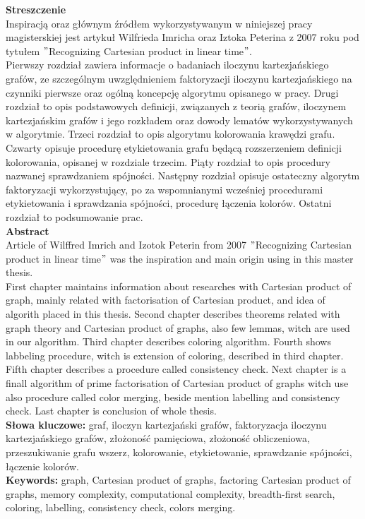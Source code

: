 \documentclass[12pt,a4paper,titlepage]{article}
\newcommand\tab[1][1cm]{\hspace*{#1}}
\begin{document}
\textbf{Streszczenie}\\
\tab[0.6cm]Inspiracją oraz głównym źródłem wykorzystywanym w niniejszej pracy magisterskiej jest artykuł Wilfrieda Imricha oraz Iztoka Peterina z 2007 roku pod tytułem $"$Recognizing Cartesian product in linear time$"$. \\
\tab[0.6cm]Pierwszy rozdział zawiera informacje o badaniach iloczynu kartezjańskiego grafów, ze szczególnym uwzględnieniem faktoryzacji iloczynu kartezjańskiego na czynniki pierwsze oraz ogólną koncepcję algorytmu opisanego w pracy. Drugi rozdział to opis podstawowych definicji, związanych z teorią grafów, iloczynem kartezjańskim grafów i jego rozkładem oraz dowody lematów wykorzystywanych w algorytmie. Trzeci rozdział to opis algorytmu kolorowania krawędzi grafu. Czwarty opisuje procedurę etykietowania grafu będącą rozszerzeniem definicji kolorowania, opisanej w rozdziale trzecim. Piąty rozdział to opis procedury nazwanej sprawdzaniem spójności. Następny rozdział opisuje ostateczny algorytm faktoryzacji wykorzystujący, po za wspomnianymi wcześniej procedurami etykietowania i sprawdzania spójności, procedurę łączenia kolorów. Ostatni rozdział to podsumowanie prac.\\
\tab[0.6cm]\textbf{Abstract}\\
\tab[0.6cm]Article of Wilffred Imrich and Izotok Peterin from 2007 $"$Recognizing Cartesian product in linear time$"$ was the inspiration and main origin using in this master thesis.\\
\tab[0.6cm]First chapter maintains information about researches with Cartesian product of graph, mainly related with factorisation of Cartesian product, and idea of algorith placed in this thesis. Second chapter describes theorems related with graph theory and Cartesian product of graphs, also few lemmas, witch are used in our algorithm. Third chapter describes coloring algorithm. Fourth shows labbeling procedure, witch is extension of coloring, described in third chapter. Fifth chapter describes a procedure called consistency check. Next chapter is a finall algorithm of prime factorisation of Cartesian product of graphs witch use also procedure called color merging, beside mention labelling and consistency check. Last chapter is conclusion of whole thesis.\\
\tab[0.6cm]\textbf{Słowa kluczowe:} graf, iloczyn kartezjański grafów, faktoryzacja iloczynu kartezjańskiego grafów, złożoność pamięciowa, złożoność obliczeniowa, przeszukiwanie grafu wszerz, kolorowanie,
etykietowanie, sprawdzanie spójności, łączenie kolorów.\\
\tab[0.6cm]\textbf{Keywords:} graph, Cartesian product of graphs, factoring Cartesian product of graphs, memory complexity, computational complexity, breadth-first search, coloring,
labelling, consistency check, colors merging.
\newpage
\tableofcontents
{}
\newpage
\end{document}
